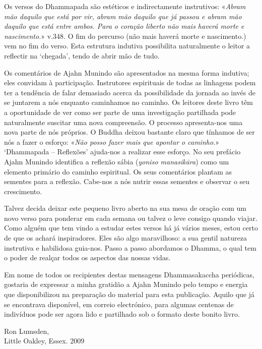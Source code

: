 Os versos do Dhammapada são estéticos e indirectamente instrutivos: «\textit{Abram mão daquilo que está por vir, abram mão daquilo que já passou e abram mão daquilo que está entre ambos. Para o coração liberto não mais haverá morte e nascimento.}» v.348. O fim do percurso (não mais haverá morte e nascimento.) vem no fim do verso. Esta estrutura indutiva possibilita naturalmente o leitor a reflectir na ‘chegada’, tendo de abrir mão de tudo.

Os comentários de Ajahn Munindo são apresentados na mesma forma indutiva; eles convidam à participação. Instrutores espirituais de todas as linhagens podem ter a tendência de falar demasiado acerca da possibilidade da jornada ao invés de se juntarem a nós enquanto caminhamos no caminho. Os leitores deste livro têm a oportunidade de ver como ser parte de uma investigação partilhada pode naturalmente suscitar uma nova compreensão. O processo apresenta-nos uma nova parte de nós próprios. O Buddha deixou bastante claro que tínhamos de ser nós a fazer o esforço: «\textit{Não posso fazer mais que apontar o caminho.}» ‘Dhammapada – Reflexões’ ajuda-nos a realizar esse esforço. No seu prefácio Ajahn Munindo identifica a reflexão sábia (\textit{yoniso manasikāra}) como um elemento primário do caminho espiritual. Os seus comentários plantam as sementes para a reflexão. Cabe-nos a nós nutrir essas sementes e observar o seu crescimento.

Talvez decida deixar este pequeno livro aberto na sua mesa de oração com um novo verso para ponderar em cada semana ou talvez o leve consigo quando viajar. Como alguém que tem vindo a estudar estes versos há já vários meses, estou certo de que os achará inspiradores. Eles são algo maravilhoso: a sua gentil natureza instrutiva e habilidosa guia-nos. Passo a passo abordamos o Dhamma, o qual tem o poder de realçar todos os aspectos das nossas vidas. 

Em nome de todos os recipientes destas mensagens Dhammasakaccha periódicas, gostaria de expressar a minha gratidão a Ajahn Munindo pelo tempo e energia que disponibilizou na preparação do material para esta publicação. Aquilo que já se encontrava disponível, em correio electrónico, para algumas centenas de indivíduos pode ser agora lido e partilhado sob o formato deste bonito livro.

\bigskip
{\par\raggedleft
Ron Lumsden,\\
Little Oakley, Essex. 2009
\par}

